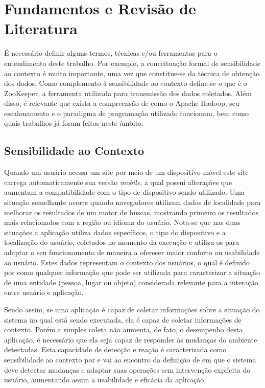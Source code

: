 \chapter{Fundamentos e Revisão de Literatura}
\label{chap:fundamentacao}
É necessário definir alguns termos, técnicas e/ou ferramentas para o entendimento deste trabalho. Por exemplo, a conceituação formal de sensibilidade ao contexto é muito importante, uma vez que constitue-se da técnica de obtenção dos dados. Como complemento à sensibilidade ao contexto define-se o que é o ZooKeeper, a ferramenta utilizada para transmissão dos dados coletados. Além disso, é relevante que exista a compreensão de como o Apache Hadoop, seu escalonamento e o paradigma de programação utilizado funcionam, bem como quais trabalhos já foram feitos neste âmbito.


\section{Sensibilidade ao Contexto}
\label{sec:ctx}
Quando um usuário acessa um site por meio de um dispositivo móvel este site carrega automaticamente sua versão \emph{mobile}, a qual possui alterações que aumentam a compatibilidade com o tipo de dispositivo sendo utilizado. Uma situação semelhante ocorre quando navegadores utilizam dados de localidade para melhorar os resultados de um motor de buscas, mostrando primeiro os resultados mais relacionados com a região ou idioma do usuário. Nota-se que nas duas situações a aplicação utiliza dados específicos, o tipo do dispositivo e a localização do usuário, coletados no momento da execução e utiliza-os para adaptar o seu funcionamento de maneira a oferecer maior conforto ou usabilidade ao usuário. Estes dados representam o contexto dos usuários, o qual é definido por \cite{Dey} como qualquer informação que pode ser utilizada para caracterizar a situação de uma entidade (pessoa, lugar ou objeto) considerada relevante para a interação entre usuário e aplicação.

Sendo assim, se uma aplicação é capaz de coletar informações sobre a situação do sistema no qual está sendo executada, ela é capaz de coletar informações de contexto. Porém a simples coleta não aumenta, de fato, o desempenho desta aplicação, é necessário que ela seja capaz de responder às mudanças do ambiente detectadas. Esta capacidade de detecção e reação é caracterizada como sensibilidade ao contexto por \cite{Maamar} e vai ao encontro da definição de \cite{Baldauf} em que o sistema deve detectar mudanças e adaptar suas operações sem intervenção explícita do usuário, aumentando assim a usabilidade e eficácia da aplicação.


